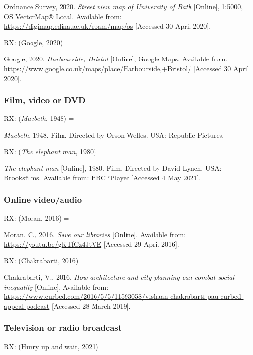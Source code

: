 Ordnance Survey, 2020. \emph{Street view map of University of Bath} [Online], 1:5000, OS VectorMap® Local. Available from: \url{https://digimap.edina.ac.uk/roam/map/os} [Accessed 30 April 2020].


RX: (Google, 2020) = \cite{google2020harbourside}

Google, 2020. \emph{Harbourside, Bristol} [Online], Google Maps. Available from: \url{https://www.google.co.uk/maps/place/Harbourside,+Bristol/} [Accessed 30 April 2020].



\subsubsection*{Film, video or DVD}

RX: (\emph{Macbeth}, 1948) = \cite{macbeth1948}

\emph{Macbeth}, 1948. Film. Directed by Orson Welles. USA: Republic Pictures.


RX: (\emph{The elephant man}, 1980) = \cite{elephant-man1980}

\emph{The elephant man} [Online], 1980. Film. Directed by David Lynch. USA: Brooksfilms. Available from: BBC iPlayer [Accessed 4 May 2021].



\subsubsection*{Online video\slash audio}

RX: (Moran, 2016) = \cite{moran2016sol}

Moran, C., 2016. \emph{Save our libraries} [Online]. Available from: \url{https://youtu.be/gKTfCz4JtVE} [Accessed 29 April 2016].


RX: (Chakrabarti, 2016) = \cite{chakrabarti2016hac}

Chakrabarti, V., 2016. \emph{How architecture and city planning can combat social inequality} [Online]. Available from: \url{https://www.curbed.com/2016/5/5/11593058/vishaan-chakrabarti-pau-curbed-appeal-podcast} [Accessed 28 March 2019].



\subsubsection*{Television or radio broadcast}

RX: (Hurry up and wait, 2021) = \cite{inn2021huw}

